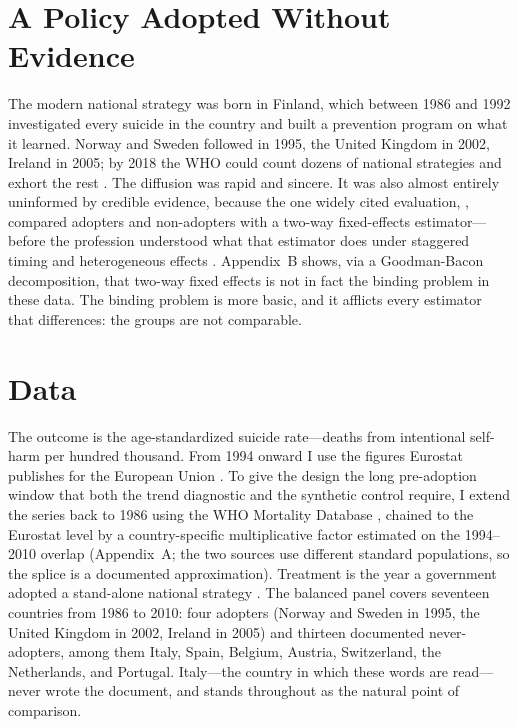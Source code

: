 \documentclass[12pt]{article}
\begin{document}
\section{A Policy Adopted Without Evidence}

The modern national strategy was born in Finland, which between 1986 and 1992 investigated every
suicide in the country and built a prevention program on what it learned. Norway and Sweden followed
in 1995, the United Kingdom in 2002, Ireland in 2005; by 2018 the WHO could count dozens of national
strategies and exhort the rest \citep{who2018strategies}. The diffusion was rapid and sincere. It
was also almost entirely uninformed by credible evidence, because the one widely cited evaluation,
\citet{matsubayashi2011effect}, compared adopters and non-adopters with a two-way fixed-effects
estimator---before the profession understood what that estimator does under staggered timing and
heterogeneous effects \citep{goodmanbacon2021did,dechaisemartin2020twoway}. Appendix~B shows, via a
Goodman-Bacon decomposition, that two-way fixed effects is not in fact the binding problem in these
data. The binding problem is more basic, and it afflicts every estimator that differences: the
groups are not comparable.

\section{Data}
\label{sec:data}

The outcome is the age-standardized suicide rate---deaths from intentional self-harm per hundred
thousand. From 1994 onward I use the figures Eurostat publishes for the European Union
\citep{eurostat_cod}. To give the design the long pre-adoption window that both the trend diagnostic
and the synthetic control require, I extend the series back to 1986 using the WHO Mortality Database
\citep{who_mdb}, chained to the Eurostat level by a country-specific multiplicative factor estimated
on the 1994--2010 overlap (Appendix~A; the two sources use different standard populations, so the
splice is a documented approximation). Treatment is the year a government adopted a stand-alone
national strategy \citep{who2018strategies,lewitzka2019national}. The balanced panel covers
seventeen countries from 1986 to 2010: four adopters (Norway and Sweden in 1995, the United Kingdom
in 2002, Ireland in 2005) and thirteen documented never-adopters, among them Italy, Spain, Belgium,
Austria, Switzerland, the Netherlands, and Portugal. Italy---the country in which these words are
read---never wrote the document, and stands throughout as the natural point of comparison.
\end{document}
